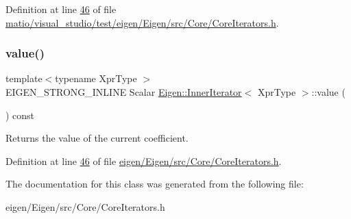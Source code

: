 Definition at line \hyperlink{matio_2visual__studio_2test_2eigen_2_eigen_2src_2_core_2_core_iterators_8h_source_l00046}{46} of file \hyperlink{matio_2visual__studio_2test_2eigen_2_eigen_2src_2_core_2_core_iterators_8h_source}{matio/visual\+\_\+studio/test/eigen/\+Eigen/src/\+Core/\+Core\+Iterators.\+h}.

\mbox{\label{class_eigen_1_1_inner_iterator_ab04bccb41eb22ffcb92dc61125aab119}} 
\subsubsection{\texorpdfstring{value()}{value()}\hspace{0.1cm}{\footnotesize\ttfamily [2/2]}}
{\footnotesize\ttfamily template$<$typename Xpr\+Type $>$ \\
E\+I\+G\+E\+N\+\_\+\+S\+T\+R\+O\+N\+G\+\_\+\+I\+N\+L\+I\+NE Scalar \hyperlink{class_eigen_1_1_inner_iterator}{Eigen\+::\+Inner\+Iterator}$<$ Xpr\+Type $>$\+::value (\begin{DoxyParamCaption}{ }\end{DoxyParamCaption}) const\hspace{0.3cm}{\ttfamily [inline]}}

\begin{DoxyReturn}{Returns}
the value of the current coefficient. 
\end{DoxyReturn}


Definition at line \hyperlink{eigen_2_eigen_2src_2_core_2_core_iterators_8h_source_l00046}{46} of file \hyperlink{eigen_2_eigen_2src_2_core_2_core_iterators_8h_source}{eigen/\+Eigen/src/\+Core/\+Core\+Iterators.\+h}.



The documentation for this class was generated from the following file\+:\begin{DoxyCompactItemize}
\item 
eigen/\+Eigen/src/\+Core/\+Core\+Iterators.\+h\end{DoxyCompactItemize}
